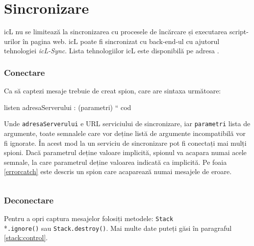 \section{Sincronizare}
\label{sync}

icL nu se limitează la sincronizarea cu procesele de încărcare și executarea script-urilor în pagina web. icL poate fi sincronizat cu back-end-ul cu ajutorul tehnologiei \textit{icL-Sync}. Lista tehnologiilor icL este disponibilă pe adresa .

\subsubsection{Conectare}

Ca să captezi mesaje trebuie de creat spion, care are sintaxa următoare:
\begin{iclcode}
listen adresaServerului : (parametri) {
	`` cod
}
\end{iclcode}

Unde \texttt{adresaServerului} e URL serviciului de sincronizare, iar \texttt{parametri} lista de argumente, toate semnalele care vor deține listă de argumente incompatibilă vor fi ignorate. În acest mod la un serviciu de sincronizare pot fi conectați mai mulți spioni. Dacă parametrul deține valoare implicită, spionul va acapara numai acele semnale, la care parametrul deține valoarea indicată ca implicită. Pe foaia \ref{errorcatch} este descris un spion care acaparează numai mesajele de eroare.


\begin{sourcecode}
    \label{errorcatch}
    \inputminted[linenos]{icl}{../sources/errorcatch.icL}
\end{sourcecode}

\subsubsection{Deconectare}

Pentru a opri captura mesajelor folosiți metodele: \texttt{Stack}\\*\texttt{.ignore()} sau \texttt{Stack.destroy()}. Mai multe date puteți găsi în paragraful \ref{stack:control}.
